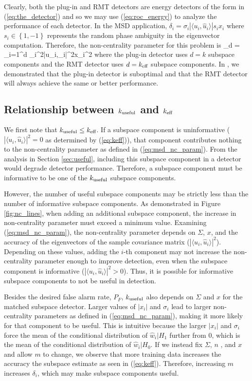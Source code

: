 Clearly, both the plug-in and RMT detectors are energy detectors of the form in 
(\ref{eq:the_detector}) and so we may use (\ref{eq:roc_energy}) to analyze the performance
of each detector. In the MSD application, $\delta_i = \sigma_i|\langle
u_i,\widehat{u}_i\rangle| s_i x_i$ where $s_i\in\left\{1,-1\right\}$ represents the
random phase ambiguity in the eigenvector computation. Therefore, the non-centrality
parameter for this problem is 
\beq\label{eq:msd_nc_param}
\lambda_d = \sum_{i=1}^d \sigma_i^2|\langle u_i,_i\rangle|^2x_i^2
\eeq
where the plug-in detector uses $d=k$ subspace components and the RMT detector uses
$d=k_\text{eff}$ subspace components. In \cite{asendorf2013performance}, we demonstrated that the
plug-in detector is suboptimal and that the RMT detector will always achieve the same or
better performance.

\subsection{Relationship between $k_{\text{useful}}$ and $k_\text{eff}$}

We first note that $k_{\text{useful}}\leq k_\text{eff}$. If a subspace component is uninformative ($|\langle
u_i,\widehat{u}_i\rangle|^2 =0$ as determined by (\ref{eq:keff})), that component
contributes nothing to the non-centrality parameter as defined in
(\ref{eq:msd_nc_param}). From the analysis in Section \ref{sec:useful}, including this
subspace component in a detector would degrade detector performance. Therefore, a subspace
component must be informative to be one of the $k_{\text{useful}}$ subspace components. 

However, the number of useful subspace components may be strictly less than the number of
informative subspace components. As demonstrated in Figure \ref{fig:nc_lines}, when adding
an additional subspace component, the increase in non-centrality parameter must exceed a
minimum value. Examining (\ref{eq:msd_nc_param}), the non-centrality parameter depends on
$\Sigma$, $x$, and the accuracy of the eigenvectors of the sample covariance matrix
($|\langle u_i, \widehat{u}_i\rangle|^2$). Depending on these values, adding the $i$-th
component may not increase the non-centrality parameter enough to improve detection, even
when the subspace component is informative ($|\langle u_i,
\widehat{u}_i\rangle|^2>0$). Thus, it is possible for informative subspace components to
not be useful in detection.

Besides the desired false alarm rate, $P_F$, $k_{\text{useful}}$ also depends on $\Sigma$ and $x$ for
the matched subspace detector. Larger values of $|x_i|$ and $\sigma_i$ lead to larger
non-centrality parameters as defined in (\ref{eq:msd_nc_param}), making it more likely for
that component to be useful.  This is intuitive because the larger $|x_i|$ and $\sigma_i$
force the mean of the conditional distribution of $\widehat{w}_i|H_1$ further from 0,
which is the mean of the conditional distribution of $\widehat{w}_i|H_0$.  If we
instead fix $\Sigma$, $n$ , and $x$ and allow $m$ to change, we observe that more training
data increases the accuracy the subspace estimate as seen in (\ref{eq:keff}). Therefore,
increasing $m$ increases $\delta_i$, which may make subspace components useful.

